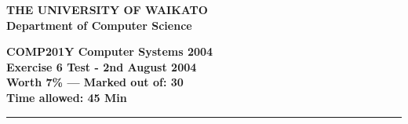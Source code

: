 \documentclass[a4paper,10pt]{article}
\begin{document}
\newcommand{\marks}[1]
{\begin{flushright}{\bf (#1 marks)}\end{flushright}}

{\centering \large \bf THE UNIVERSITY OF WAIKATO\\}
{\centering \large \bf Department of Computer Science\\[0.5cm]}

{\centering \large \bf COMP201Y Computer Systems 2004\\}
{\centering \large \bf Exercise 6 Test - 2nd August 2004\\[0.3cm]}
{\centering \bf Worth 7\% --- Marked out of: 30\\[0.3cm]}
{\centering \bf Time allowed: 45 Min\\[1cm]}
\hrule
\end{document}
